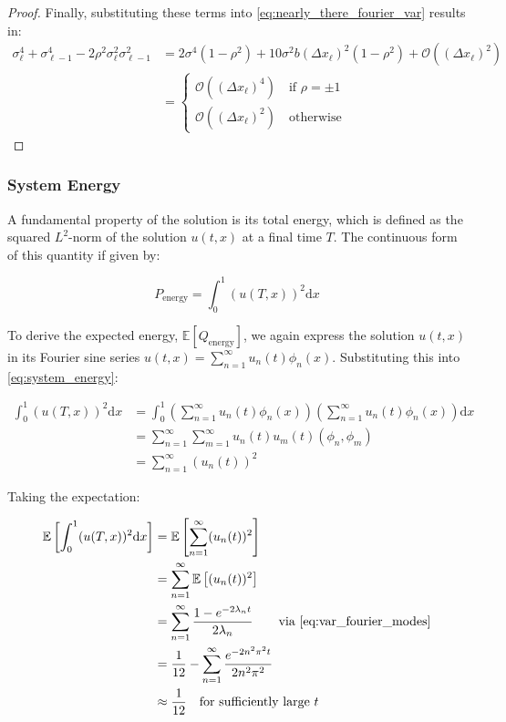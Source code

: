 \begin{proof}
    Finally, substituting these terms into \eqref{eq:nearly_there_fourier_var}
    results in:
    \begin{align*}
        \sigma_\ell^4 + \sigma_{\ell-1}^4 - 2\rho^2 \sigma_\ell^2 
        \sigma_{\ell-1}^2 &= 2 \sigma^4(1 - \rho^2) + 10 \sigma^2b 
        (\Delta x_\ell)^2(1 - \rho^2) + 
        \mathcal{O}\left((\Delta x_\ell)^2\right) \\
        &= \begin{cases}
        \mathcal{O}\left((\Delta x_\ell)^4\right) \quad \text{if } 
        \rho = \pm 1 \\
        \mathcal{O}\left((\Delta x_\ell)^2\right) \quad \text{otherwise}
        \end{cases}
    \end{align*}

\end{proof}


\subsubsection{System Energy}

A fundamental property of the solution is its total energy, which is defined 
as the squared $L^2$-norm of the solution $u(t,x)$ at a final time $T$. The 
continuous form of this quantity if given by:

\begin{equation}\label{eq:system_energy}
P_{\text{energy}} = \int_0^1 (u(T,x))^2 \mathrm{d}x
\end{equation}

To derive the expected energy, $\mathbb{E}[Q_{\text{energy}}]$, 
we again express the solution 
$u(t,x)$ in its Fourier sine series
$u(t,x) = \sum_{n=1}^\infty u_n(t)\phi_n(x)$. Substituting this into 
\eqref{eq:system_energy}:

\begin{align*}
    \int_0^1 (u(T,x))^2 \mathrm{d}x &= 
    \int_0^1\left(\sum_{n=1}^\infty u_n(t)\phi_n(x)\right)
    \left(\sum_{n=1}^\infty u_n(t)\phi_n(x)\right) \mathrm{d}x \\
    &= \sum_{n=1}^\infty \sum_{m=1}^\infty u_n(t) u_m(t) (\phi_n, \phi_m) \\
    &= \sum_{n=1}^\infty (u_n(t))^2
\end{align*}

Taking the expectation:

\begin{align}
    \mathbb{E}\left[\int_0^1 (u(T,x))^2 \mathrm{d}x\right] &= 
    \mathbb{E}\left[\sum_{n=1}^\infty (u_n(t))^2\right] 
    \nonumber
    \\
    &= \sum_{n=1}^\infty \mathbb{E}\left[(u_n(t))^2\right] 
    \nonumber
    \\
    &= \sum_{n=1}^\infty \frac{1-e^{-2\lambda_n t}}{2\lambda_n}
    \qquad \text{via } \eqref{eq:var_fourier_modes}
    \nonumber
    \\
    &= \frac{1}{12} - \sum_{n=1}^\infty \frac{e^{-2n^2 \pi^2 t}}{2 n^2 \pi^2}
    \nonumber
    \\
    &\approx \frac{1}{12} \quad \text{for sufficiently large } t
    \label{eq:she_energy_analytic_soln}
\end{align}
